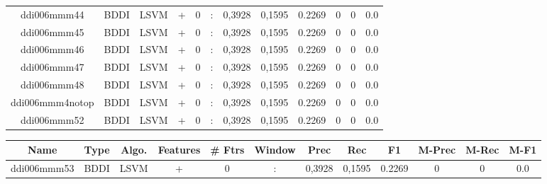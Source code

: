 \documentclass[a4paper]{article}
\begin{document}
\begin{landscape}
\begin{center}
\begin{tabular}{ |c|c|c|c|c|c|c|c|c|c|c|c|}
 	
 
 	
 		
 		\small{ ddi006mmm44 } & BDDI & LSVM & +  &  0 &  :  &  0,3928 & 0,1595 & 0.2269  &  0 & 0 & 0.0 \\
 		

 	
 
 	
 		
 		\small{ ddi006mmm45 } & BDDI & LSVM & +  &  0 &  :  &  0,3928 & 0,1595 & 0.2269  &  0 & 0 & 0.0 \\
 		

 	
 
 	
 		
 		\small{ ddi006mmm46 } & BDDI & LSVM & +  &  0 &  :  &  0,3928 & 0,1595 & 0.2269  &  0 & 0 & 0.0 \\
 		

 	
 
 	
 		
 		\small{ ddi006mmm47 } & BDDI & LSVM & +  &  0 &  :  &  0,3928 & 0,1595 & 0.2269  &  0 & 0 & 0.0 \\
 		

 	
 
 	
 		
 		\small{ ddi006mmm48 } & BDDI & LSVM & +  &  0 &  :  &  0,3928 & 0,1595 & 0.2269  &  0 & 0 & 0.0 \\
 		

 	
 
 	
 		
 		\small{ ddi006mmm4notop } & BDDI & LSVM & +  &  0 &  :  &  0,3928 & 0,1595 & 0.2269  &  0 & 0 & 0.0 \\
 		

 	
 
 	
 		
 		\small{ ddi006mmm52 } & BDDI & LSVM & +  &  0 &  :  &  0,3928 & 0,1595 & 0.2269  &  0 & 0 & 0.0 \\
 		
 \hline
\end{tabular}
\end{center}




\begin{center}
\begin{tabular}{ |c|c|c|c|c|c|c|c|c|c|c|c|} 
 \hline
 	Name & Type & Algo. & Features & \# Ftrs & Window & Prec & Rec & F1 & M-Prec & M-Rec & M-F1\\
 \hline

 		

 	
 
 	
 		
 		\small{ ddi006mmm53 } & BDDI & LSVM & +  &  0 &  :  &  0,3928 & 0,1595 & 0.2269  &  0 & 0 & 0.0 \\
 		


\end{tabular}
\end{center}
\end{landscape}
\end{document}
